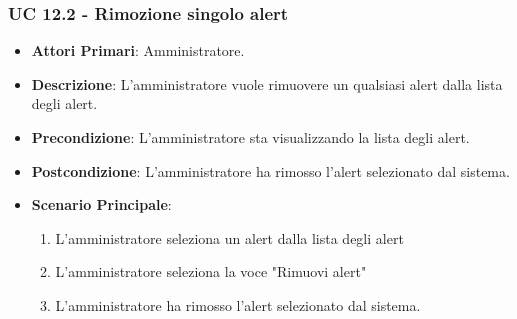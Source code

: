 		\subsubsection{UC 12.2 - Rimozione singolo alert}
		\begin{itemize}
			\item \textbf{Attori Primari}: Amministratore.
			\item \textbf{Descrizione}: L'amministratore vuole rimuovere un qualsiasi alert dalla lista degli alert.
			\item \textbf{Precondizione}: L'amministratore sta visualizzando la lista degli alert.
			\item \textbf{Postcondizione}: L'amministratore ha rimosso l'alert selezionato dal sistema.
			\item \textbf{Scenario Principale}:
			\begin{enumerate}
				\item{L'amministratore seleziona un alert dalla lista degli alert}
				\item{L'amministratore seleziona la voce "Rimuovi alert"}
				\item{L'amministratore ha rimosso l'alert selezionato dal sistema.}
			\end{enumerate}	
		\end{itemize}